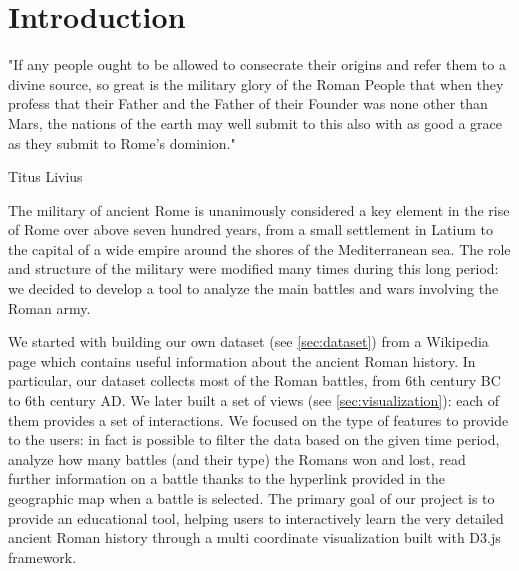 \section{Introduction}
\begin{displayquote}
    "If any people ought to be allowed to consecrate their origins and refer them to a divine source, so great is the military glory of the Roman People that when they profess that their Father and the Father of their Founder was none other than Mars, the nations of the earth may well submit to this also with as good a grace as they submit to Rome's dominion."
    \begin{flushright}
        Titus Livius
    \end{flushright}
\end{displayquote}

The military of ancient Rome is unanimously considered a key element in the rise of Rome over above seven hundred years, from a small settlement in Latium to the capital of a wide empire around the shores of the Mediterranean sea.
The role and structure of the military were modified many times during this long period: we decided to develop a tool to analyze the main battles and wars involving the Roman army.

We started with building our own dataset (see \ref{sec:dataset}) from a Wikipedia page which contains useful information about the ancient Roman history.
In particular, our dataset collects most of the Roman battles, from 6th century BC to 6th century AD. We later built a set of views (see \ref{sec:visualization}): each of them provides a set of interactions.
We focused on the type of features to provide to the users: in fact is possible to filter the data based on the given time period, analyze how many battles (and their type) the Romans won and lost, read further information on a battle thanks to the hyperlink provided in the geographic map when a battle is selected.
The primary goal of our project is to provide an educational tool, helping users to interactively learn the very detailed ancient Roman history through a multi coordinate visualization built with D3.js framework.
